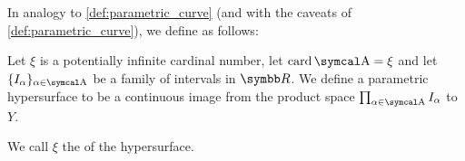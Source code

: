 \begin{definition}\label{def:parametric_hypersurface}
  In analogy to \cref{def:parametric_curve} (and with the caveats of \cref{def:parametric_curve}), we define  as follows:

  Let \( \xi \) is a potentially infinite cardinal number, let \( \Card \CA = \xi \) and let \( \{ I_\alpha \}_{\alpha \in \CA} \) be a family of intervals in \( \BR \). We define a parametric hypersurface to be a continuous image from the product space \( \prod_{\alpha \in \CA} I_\alpha \) to \( Y \).

  We call \( \xi \) the  of the hypersurface.
\end{definition}
